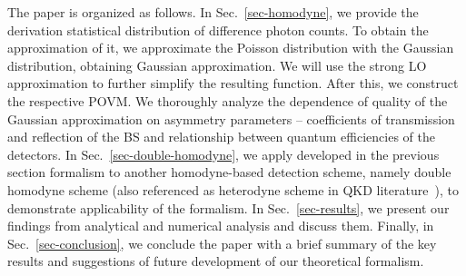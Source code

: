 \documentclass[]{article}
\begin{document}

The paper is organized as follows.
In Sec.~\ref{sec-homodyne}, we provide the derivation statistical distribution of difference photon counts.
To obtain the approximation of it, we approximate the Poisson distribution with the Gaussian distribution, obtaining Gaussian approximation. We will use the strong LO approximation to further simplify the resulting function. After this, we construct the respective POVM.
We thoroughly analyze the dependence of quality of the Gaussian approximation on asymmetry parameters -- coefficients of transmission and reflection of the BS and relationship between quantum efficiencies of the detectors.
In Sec.~\ref{sec-double-homodyne}, we apply developed in the previous section formalism to another homodyne-based detection scheme, namely double homodyne scheme (also referenced as heterodyne scheme in QKD literature{~\cite{Pirandola:20,opt3040030,10.1063/5.0179566}}), to demonstrate applicability of the formalism.
In Sec.~\ref{sec-results}, we present our findings from analytical and numerical analysis and discuss them.
Finally, in Sec.~\ref{sec-conclusion}, we conclude the paper with a brief summary of the key results and suggestions of future development of our theoretical formalism.
\end{document}
